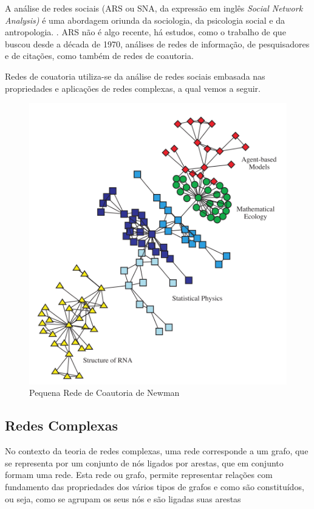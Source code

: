 \documentclass[12pt]{article}
\begin{document}
A análise de redes sociais (ARS ou SNA, da expressão em inglês \textit{Social Network Analysis)} é uma abordagem oriunda da sociologia, da psicologia social e da antropologia. \cite{freeman1996some,wasserman1994social}. ARS não é algo recente, há estudos, como o trabalho de \cite{otte2002social} que buscou desde a década de 1970, análises de redes de informação, de pesquisadores e de citações, como também de redes de coautoria.

 Redes de couatoria utiliza-se da análise de redes sociais embasada nas propriedades e aplicações de redes complexas, a qual vemos a seguir.


\begin{figure}[H]
\centering
\includegraphics[scale=0.6]{images/rede-newman.PNG}
\caption{Pequena Rede de Coautoria de Newman}
\label{rede1}
\end{figure}


\subsection{Redes Complexas}

No contexto da teoria de redes complexas, uma rede corresponde a um grafo, que se representa por um conjunto de nós ligados por arestas, que em conjunto formam uma rede.  Esta rede ou grafo, permite representar relações com fundamento das propriedades dos vários tipos de grafos e como são constituídos, ou seja, como se agrupam os seus nós e são ligadas suas arestas %
\end{document}
